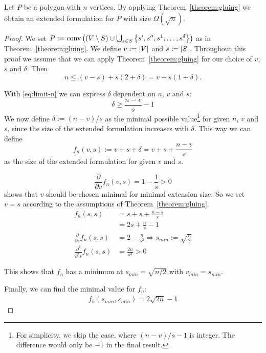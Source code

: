 \begin{observation}\label{observation:limits-of-gluing}
  Let $P$ be a polygon with $n$ vertices. By applying Theorem~\ref{theorem:gluing} we obtain an extended formulation for $P$ with size $\Omega(\sqrt{n})$.
\end{observation}
\begin{proof}
  We set $P := \operatorname{conv}\left( (V \setminus S) \cup \bigcup_{s \in S} \left\{ s',s'',s^1,\dots,s^\delta \right\} \right)$ as in Theorem~\ref{theorem:gluing}. We define $v := \lvert V\rvert$ and $s := \lvert S\rvert$. Throughout this proof we assume that we can apply Theorem~\ref{theorem:gluing} for our choice of $v$, $s$ and $\delta$. Then
  \begin{equation}\label{eq:limit-n}
    n \leq (v-s) + s(2+\delta) = v + s(1+\delta).
  \end{equation}

  With \eqref{eq:limit-n} we can express $\delta$ dependent on $n$, $v$ and $s$:
  \begin{equation*}
    \delta \geq \frac{n-v}{s} - 1
  \end{equation*}
  We now define $\delta := (n-v)/s$ as the minimal possible value\footnote{For simplicity, we skip the case, where $(n-v)/s - 1$ is integer. The difference would only be $-1$ in the final result.} for given $n$, $v$ and $s$, since the size of the extended formulation increases with $\delta$. This way we can define $$f_n(v,s) := v + s + \delta = v + s + \frac{n-v}{s}$$ as the size of the extended formulation for given $v$ and $s$.

  $$\frac{\partial}{\partial v} f_n(v,s) = 1 - \frac{1}{s} > 0$$ shows that $v$ should be chosen minimal for minimal extension size. So we set $v = s$ according to the assumptions of Theorem~\ref{theorem:gluing}.
  \begin{align*}
    f_n(s, s) &= s + s + \frac{n-s}{s} \\
    &= 2s + \frac{n}{s} - 1\\
    \frac{\partial}{\partial s} f_n(s,s) &= 2 - \frac{n}{s^2} \Rightarrow s_{min} := \sqrt{\frac{n}{2}} \\
    \frac{\partial^2}{\partial^2 s} f_n(s,s) &= \frac{2n}{s^3} > 0
  \end{align*}

  This shows that $f_n$ has a minimum at $s_{min} = \sqrt{n/2}$ with $v_{min}=s_{min}$.

  Finally, we can find the minimal value for $f_n$:
  \begin{align*}
    f_n(s_{min}, s_{min}) = 2\sqrt{2n} - 1
  \end{align*}
\end{proof}



